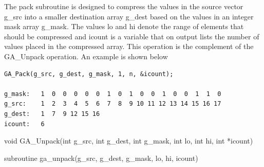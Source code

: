 \documentclass[10pt]{article}
\begin{document}
\gcoll

\begin{desc}
The pack subroutine is designed to compress the values in the source vector
g_src into a smaller destination array g_dest based on the values in an integer
mask array g_mask. The values lo and hi denote the range of elements that
should be compressed and icount is a variable that on output lists the number
of values placed in the compressed array. This operation is the complement of
the GA_Unpack operation. An example is shown below
\begin{verbatim}
GA_Pack(g_src, g_dest, g_mask, 1, n, &icount);

g_mask:   1  0  0  0  0  0  1  0  1  0  0  1  0  0  1  1  0
g_src:    1  2  3  4  5  6  7  8  9 10 11 12 13 14 15 16 17
g_dest:   1  7  9 12 15 16
icount:   6
\end{verbatim}
\end{desc}



\begin{capi}
\begin{ccode}
void GA_Unpack(int g_src, int g_dest, int g_mask,
               int lo, int hi, int *icount)
\end{ccode}
\begin{funcargs}
\end{funcargs}
\end{capi}

\begin{fapi}
\begin{fcode}
subroutine ga_unpack(g_src, g_dest, g_mask, lo, hi, icount)
\end{fcode}
\begin{funcargs}
\end{funcargs}
\end{fapi}
\end{document}
